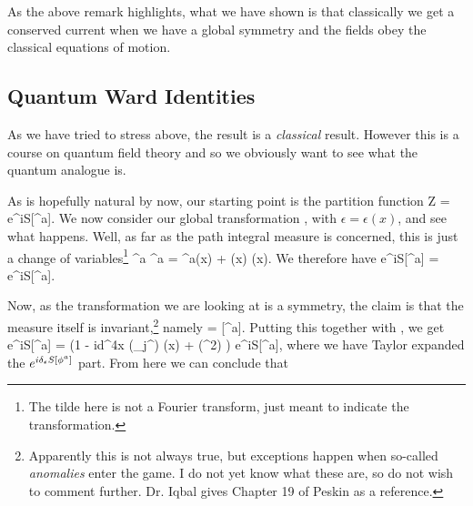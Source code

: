 As the above remark highlights, what we have shown is that classically we get a conserved current when we have a global symmetry and the fields obey the classical equations of motion. 

\subsection{Quantum Ward Identities}

As we have tried to stress above, the result  is a \textit{classical} result. However this is a course on quantum field theory and so we obviously want to see what the quantum analogue is. 

As is hopefully natural by now, our starting point is the partition function 
\bse 
    Z = \int [\pD \phi^a] e^{iS[\phi^a]}.
\ese 
We now consider our global transformation , with $\epsilon=\epsilon(x)$, and see what happens. Well, as far as the path integral measure is concerned, this is just a change of variables\footnote{The tilde here is not a Fourier transform, just meant to indicate the transformation.}
\bse 
    \phi^a \to \widetilde{\phi}^a = \phi^a(x) + \epsilon(x) \del \phi(x).
\ese 
We therefore have 
\bse 
    \int [\pD \phi^a] e^{iS[\phi^a]} =  e^{iS[\widetilde{\phi}^a]}.
\ese

Now, as the transformation we are looking at is a symmetry, the claim is that the measure itself is invariant,\footnote{Apparently this is not always true, but exceptions happen when so-called \textit{anomalies} enter the game. I do not yet know what these are, so do not wish to comment further. Dr. Iqbal gives Chapter 19 of Peskin as a reference.} namely 
 = [\pD \phi^a].
\ese 
Putting this together with , we get 
\bse 
    \int [\pD \phi^a] e^{iS[\phi^a]} = \int [\pD \phi^a] \bigg(1 - i\int d^4x (\p_{\mu}j^{\mu}) \epsilon(x) + \cO(\epsilon^2) \bigg) e^{iS[\phi^a]},
\ese 
where we have Taylor expanded the $e^{i\delta_{\epsilon}S[\phi^a]}$ part. From here we can conclude that 

